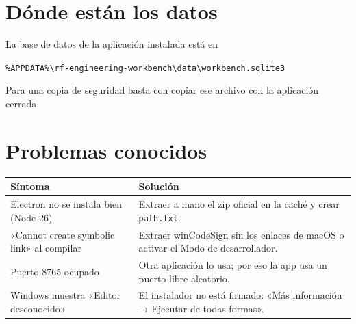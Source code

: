 \section{Dónde están los datos}
La base de datos de la aplicación instalada está en
\begin{center}\small\texttt{\%APPDATA\%\textbackslash rf-engineering-workbench\textbackslash data\textbackslash workbench.sqlite3}\end{center}
Para una copia de seguridad basta con copiar ese archivo con la aplicación cerrada.

\section{Problemas conocidos}
\begin{center}\small
\begin{tabularx}{\linewidth}{@{}p{5.4cm}X@{}}\toprule
\textbf{Síntoma} & \textbf{Solución}\\ \midrule
Electron no se instala bien (Node 26) & Extraer a mano el zip oficial en la caché y crear \texttt{path.txt}.\\
«Cannot create symbolic link» al compilar & Extraer winCodeSign sin los enlaces de macOS o activar el Modo de desarrollador.\\
Puerto 8765 ocupado & Otra aplicación lo usa; por eso la app usa un puerto libre aleatorio.\\
Windows muestra «Editor desconocido» & El instalador no está firmado: «Más información → Ejecutar de todas formas».\\ \bottomrule
\end{tabularx}
\end{center}
